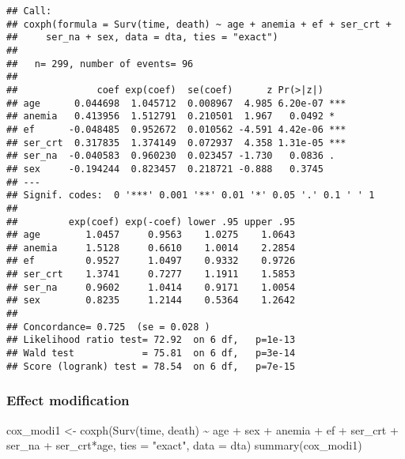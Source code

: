 \documentclass[
]{article}
\newenvironment{Shaded}{\begin{snugshade}}{\end{snugshade}}
\newcommand{\AttributeTok}[1]{\textcolor[rgb]{0.77,0.63,0.00}{#1}}
\newcommand{\FunctionTok}[1]{\textcolor[rgb]{0.00,0.00,0.00}{#1}}
\newcommand{\NormalTok}[1]{#1}
\newcommand{\OtherTok}[1]{\textcolor[rgb]{0.56,0.35,0.01}{#1}}
\newcommand{\SpecialCharTok}[1]{\textcolor[rgb]{0.00,0.00,0.00}{#1}}
\newcommand{\StringTok}[1]{\textcolor[rgb]{0.31,0.60,0.02}{#1}}
\begin{document}
\begin{verbatim}
## Call:
## coxph(formula = Surv(time, death) ~ age + anemia + ef + ser_crt + 
##     ser_na + sex, data = dta, ties = "exact")
## 
##   n= 299, number of events= 96 
## 
##              coef exp(coef)  se(coef)      z Pr(>|z|)    
## age      0.044698  1.045712  0.008967  4.985 6.20e-07 ***
## anemia   0.413956  1.512791  0.210501  1.967   0.0492 *  
## ef      -0.048485  0.952672  0.010562 -4.591 4.42e-06 ***
## ser_crt  0.317835  1.374149  0.072937  4.358 1.31e-05 ***
## ser_na  -0.040583  0.960230  0.023457 -1.730   0.0836 .  
## sex     -0.194244  0.823457  0.218721 -0.888   0.3745    
## ---
## Signif. codes:  0 '***' 0.001 '**' 0.01 '*' 0.05 '.' 0.1 ' ' 1
## 
##         exp(coef) exp(-coef) lower .95 upper .95
## age        1.0457     0.9563    1.0275    1.0643
## anemia     1.5128     0.6610    1.0014    2.2854
## ef         0.9527     1.0497    0.9332    0.9726
## ser_crt    1.3741     0.7277    1.1911    1.5853
## ser_na     0.9602     1.0414    0.9171    1.0054
## sex        0.8235     1.2144    0.5364    1.2642
## 
## Concordance= 0.725  (se = 0.028 )
## Likelihood ratio test= 72.92  on 6 df,   p=1e-13
## Wald test            = 75.81  on 6 df,   p=3e-14
## Score (logrank) test = 78.54  on 6 df,   p=7e-15
\end{verbatim}

\hypertarget{effect-modification}{%
\subsubsection{Effect modification}\label{effect-modification}}

\begin{Shaded}
\begin{Highlighting}[]
\NormalTok{cox\_modi1 }\OtherTok{\textless{}{-}} \FunctionTok{coxph}\NormalTok{(}\FunctionTok{Surv}\NormalTok{(time, death) }\SpecialCharTok{\textasciitilde{}}\NormalTok{ age  }\SpecialCharTok{+}\NormalTok{ sex }\SpecialCharTok{+}\NormalTok{ anemia }\SpecialCharTok{+}\NormalTok{ ef }\SpecialCharTok{+}\NormalTok{ ser\_crt }\SpecialCharTok{+}\NormalTok{ ser\_na }\SpecialCharTok{+}\NormalTok{ ser\_crt}\SpecialCharTok{*}\NormalTok{age, }\AttributeTok{ties =} \StringTok{"exact"}\NormalTok{, }\AttributeTok{data =}\NormalTok{ dta)}
\FunctionTok{summary}\NormalTok{(cox\_modi1)}
\end{Highlighting}
\end{Shaded}
\end{document}

